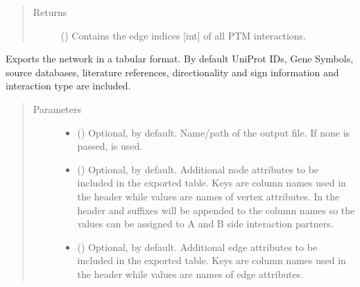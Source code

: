 \documentclass[letterpaper,10pt,english]{sphinxmanual}
\begin{document}
\begin{fulllineitems}
\begin{fulllineitems}
\begin{quote}
\begin{description}
\item[{Returns}] \leavevmode
() \textendash{} Contains the edge indices {[}int{]} of all PTM
interactions.

\end{description}\end{quote}

\end{fulllineitems}


\begin{fulllineitems}
\label{\detokenize{reference:pypath.main.PyPath.export_tab}}
Exports the network in a tabular format. By default UniProt IDs,
Gene Symbols, source databases, literature references,
directionality and sign information and interaction type are
included.
\begin{quote}\begin{description}
\item[{Parameters}] \leavevmode\begin{itemize}
\item {} 
 () \textendash{} Optional,  by default. Name/path of the output file.
If none is passed, 
is used.

\item {} 
 () \textendash{} Optional, \sphinxcode{\sphinxupquote{\{\}}} by default. Additional node attributes to
be included in the exported table. Keys are column names
used in the header while values are names of vertex
attributes. In the header  and  suffixes
will be appended to the column names so the values can be
assigned to A and B side interaction partners.

\item {} 
 () \textendash{} Optional, \sphinxcode{\sphinxupquote{\{\}}} by default. Additional edge attributes to
be included in the exported table. Keys are column names
used in the header while values are names of edge
attributes.


\end{itemize}
\end{description}
\end{quote}
\end{fulllineitems}
\end{fulllineitems}
\end{document}
